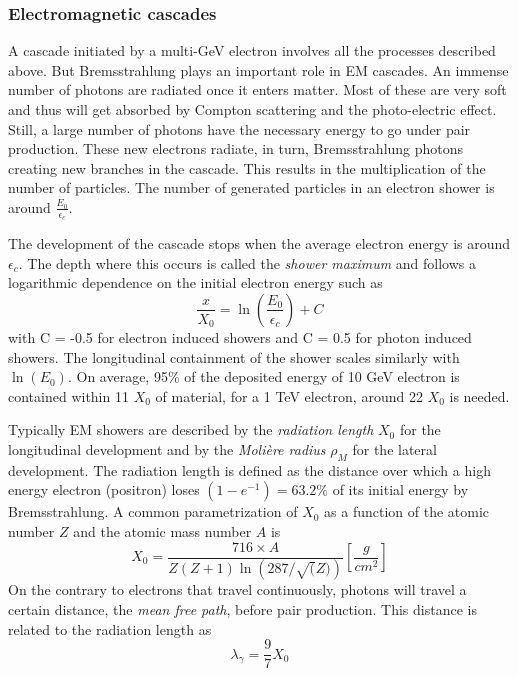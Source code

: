 \subsubsection{Electromagnetic cascades}
\label{subsubsec:EMcascade}

A cascade initiated by a multi-GeV electron involves all the processes described above. But Bremsstrahlung plays an important role in EM cascades. An immense number of photons are radiated once it enters matter. Most of these are very soft and thus will get absorbed by Compton scattering and the photo-electric effect. Still, a large number of photons have the necessary energy to go under pair production. These new electrons radiate, in turn, Bremsstrahlung photons creating new branches in the cascade. This results in the multiplication of the number of particles. The number of generated particles in an electron shower is around $\frac{E_0}{\epsilon_{c}}$.

The development of the cascade stops when the average electron energy is around $\epsilon_{c}$. The depth where this occurs is called the \textit{shower maximum} and follows a logarithmic dependence on the initial electron energy such as \cite{Wigmans:392793}
\begin{equation}
  \frac{x}{X_0} = \ln\left(\frac{E_0}{\epsilon_{c}}\right) + C
\end{equation}
with C = -0.5 for electron induced showers and C = 0.5 for photon induced showers. The longitudinal containment of the shower scales similarly with $\ln\left(E_0\right)$. On average, 95\% of the deposited energy of 10 GeV electron is contained within 11 $X_0$ of material, for a 1 TeV electron, around 22 $X_0$ is needed.

Typically EM showers are described by the \textit{radiation length} $X_0$ for the longitudinal development and by the \textit{Moli\`ere radius} $\rho_{M}$ for the lateral development. The radiation length is defined as the distance over which a high energy electron (positron) loses $(1 - e^{-1}) = 63.2\%$ of its initial energy by Bremsstrahlung. A common parametrization of $X_0$ as a function of the atomic number $Z$ and the atomic mass number $A$ is \cite{Wigmans:392793}
\begin{equation}
  X_0 = \frac{716 \times A}{Z(Z+1)\ln\left(287/\sqrt(Z)\right)} [\frac{g}{cm^2}]
\end{equation}
On the contrary to electrons that travel continuously, photons will travel a certain distance, the \textit{mean free path}, before pair production. This distance is related to the radiation length as
\begin{equation}
  \lambda_{\gamma} = \frac{9}{7} X_0
\end{equation}


